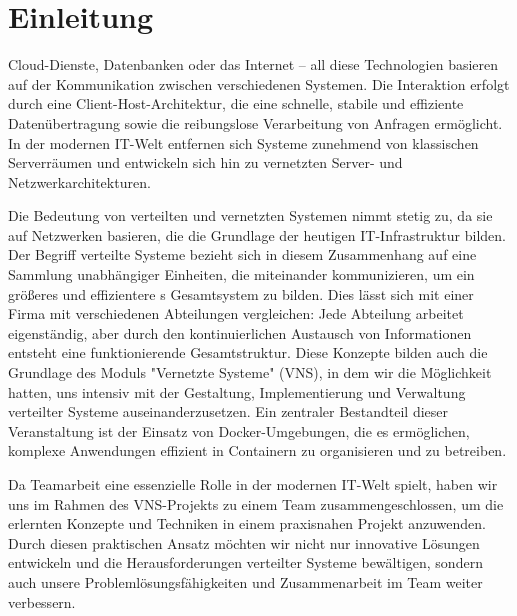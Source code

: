 \section{Einleitung}\label{einleitung}

Cloud-Dienste, Datenbanken oder das Internet – all diese Technologien basieren auf der Kommunikation zwischen verschiedenen Systemen. Die Interaktion erfolgt durch eine Client-Host-Architektur, die eine schnelle, stabile und effiziente Datenübertragung sowie die reibungslose Verarbeitung von Anfragen ermöglicht. In der modernen IT-Welt entfernen sich Systeme zunehmend von klassischen Serverräumen und entwickeln sich hin zu vernetzten Server- und Netzwerkarchitekturen. 

Die Bedeutung von verteilten und vernetzten Systemen nimmt stetig zu, da sie auf Netzwerken basieren, die die Grundlage der heutigen IT-Infrastruktur bilden. Der Begriff verteilte Systeme bezieht sich in diesem Zusammenhang auf eine Sammlung unabhängiger Einheiten, die miteinander kommunizieren, um ein größeres und effizientere	s Gesamtsystem zu bilden. Dies lässt sich mit einer Firma mit verschiedenen Abteilungen vergleichen: Jede Abteilung arbeitet eigenständig, aber durch den kontinuierlichen Austausch von Informationen entsteht eine funktionierende Gesamtstruktur. 
Diese Konzepte bilden auch die Grundlage des Moduls "Vernetzte Systeme" (VNS), in dem wir die Möglichkeit hatten, uns intensiv mit der Gestaltung, Implementierung und Verwaltung verteilter Systeme auseinanderzusetzen. Ein zentraler Bestandteil dieser Veranstaltung ist der Einsatz von Docker-Umgebungen, die es ermöglichen, komplexe Anwendungen effizient in Containern zu organisieren und zu betreiben. 

Da Teamarbeit eine essenzielle Rolle in der modernen IT-Welt spielt, haben wir uns im Rahmen des VNS-Projekts zu einem Team zusammengeschlossen, um die erlernten Konzepte und Techniken in einem praxisnahen Projekt anzuwenden. Durch diesen praktischen Ansatz möchten wir nicht nur innovative Lösungen entwickeln und die Herausforderungen verteilter Systeme bewältigen, sondern auch unsere Problemlösungsfähigkeiten und Zusammenarbeit im Team weiter verbessern. 


